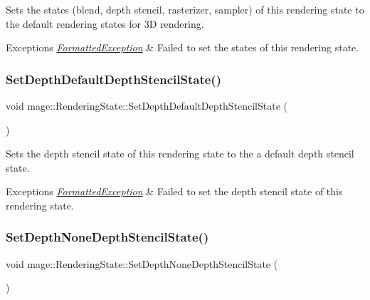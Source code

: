 Sets the states (blend, depth stencil, rasterizer, sampler) of this rendering state to the default rendering states for 3D rendering.


\begin{DoxyExceptions}{Exceptions}
{\em \hyperlink{structmage_1_1_formatted_exception}{Formatted\+Exception}} & Failed to set the states of this rendering state. \\
\hline
\end{DoxyExceptions}
\hypertarget{structmage_1_1_rendering_state_a88933420c94d4127973d8148ccd97e86}{}\label{structmage_1_1_rendering_state_a88933420c94d4127973d8148ccd97e86} 
\subsubsection{\texorpdfstring{Set\+Depth\+Default\+Depth\+Stencil\+State()}{SetDepthDefaultDepthStencilState()}}
{\footnotesize\ttfamily void mage\+::\+Rendering\+State\+::\+Set\+Depth\+Default\+Depth\+Stencil\+State (\begin{DoxyParamCaption}{ }\end{DoxyParamCaption})}

Sets the depth stencil state of this rendering state to the a default depth stencil state.


\begin{DoxyExceptions}{Exceptions}
{\em \hyperlink{structmage_1_1_formatted_exception}{Formatted\+Exception}} & Failed to set the depth stencil state of this rendering state. \\
\hline
\end{DoxyExceptions}
\hypertarget{structmage_1_1_rendering_state_a67db088d08560ab5f3adde28032972a4}{}\label{structmage_1_1_rendering_state_a67db088d08560ab5f3adde28032972a4} 
\subsubsection{\texorpdfstring{Set\+Depth\+None\+Depth\+Stencil\+State()}{SetDepthNoneDepthStencilState()}}
{\footnotesize\ttfamily void mage\+::\+Rendering\+State\+::\+Set\+Depth\+None\+Depth\+Stencil\+State (\begin{DoxyParamCaption}{ }\end{DoxyParamCaption})}

